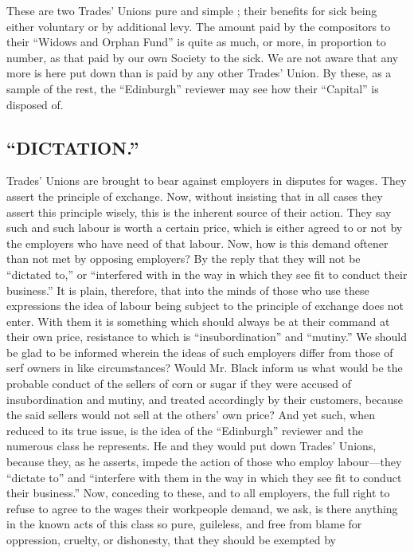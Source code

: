 These are two Trades' Unions pure and simple ; their benefits for sick
being either voluntary or by additional levy. The amount paid by the
compositors to their ``Widows and Orphan Fund'' is quite as much, or
more, in proportion to number, as that paid by our own Society to the
sick. We are not aware that any more is here put down than is paid by
any other Trades' Union. By these, as a sample of the rest, the
``Edinburgh'' reviewer may see how their ``Capital'' is disposed of.

\subsection{``DICTATION.''}

Trades' Unions are brought to bear against employers in
disputes for wages. They assert the principle of exchange. Now, without
insisting that in all cases they assert this principle wisely, this is
the inherent source of their action. They say such and such labour is
worth a certain price, which is either agreed to or not by the employers
who have need of that labour. Now, how is this demand oftener than not
met by opposing employers? By the reply that they will not be
``dictated to,'' or ``interfered with in the way in which they see fit
to conduct their business.'' It is plain, therefore, that into the minds
of those who use these expressions the idea of labour being subject to
the principle of exchange does not enter. With them it is something
which should always be at their command at their own price, resistance
to which is ``insubordination'' and ``mutiny.'' We should be glad to be
informed wherein the ideas of such employers differ from those of serf
owners in like circumstances? Would Mr. Black inform us what would be
the probable conduct of the sellers of corn or sugar if they were
accused of insubordination and mutiny, and treated accordingly by their
customers, because the said sellers would not sell at the others' own
price? And yet such, when reduced to its true issue, is the idea of the
``Edinburgh'' reviewer and the numerous class he represents. He and they
would put down Trades' Unions, because they, as he asserts, impede the
action of those who employ labour---they ``dictate to'' and ``interfere
with them in the way in which they see fit to conduct their business.''
Now, conceding to these, and to all employers, the full right to refuse
to agree to the wages their workpeople demand, we ask, is there anything
in the known acts of this class so pure, guileless, and free from blame
for oppression, cruelty, or dishonesty, that they should be exempted by
